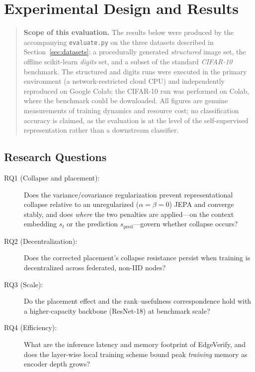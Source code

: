 \chapter{Experimental Design and Results}
\label{chap:results}

\begin{quote}
\textbf{Scope of this evaluation.} The results below were produced by the
accompanying \texttt{evaluate.py} on the three datasets described in
Section~\ref{sec:datasets}: a procedurally generated \emph{structured}
image set, the offline scikit-learn \emph{digits} set, and a subset of the
standard \emph{CIFAR-10} benchmark. The structured and digits runs were
executed in the primary environment (a network-restricted cloud CPU) and
independently reproduced on Google Colab; the CIFAR-10 run was performed on
Colab, where the benchmark could be downloaded. All figures are genuine
measurements of training dynamics and resource cost; no classification
accuracy is claimed, as the evaluation is at the level of the
self-supervised representation rather than a downstream classifier.
\end{quote}

\section{Research Questions}
\begin{description}
    \item[RQ1 (Collapse and placement):] Does the variance/covariance
    regularization prevent representational collapse relative to an
    unregularized ($\alpha = \beta = 0$) JEPA and converge stably, and does
    \emph{where} the two penalties are applied---on the context embedding
    $s_t$ or the prediction $s_{\text{pred}}$---govern whether collapse
    occurs?
    \item[RQ2 (Decentralization):] Does the corrected placement's collapse
    resistance persist when training is decentralized across federated,
    non-IID nodes?
    \item[RQ3 (Scale):] Do the placement effect and the rank--usefulness
    correspondence hold with a higher-capacity backbone (ResNet-18) at
    benchmark scale?
    \item[RQ4 (Efficiency):] What are the inference latency and memory
    footprint of EdgeVerify, and does the layer-wise local training scheme
    bound peak \emph{training} memory as encoder depth grows?
\end{description}


